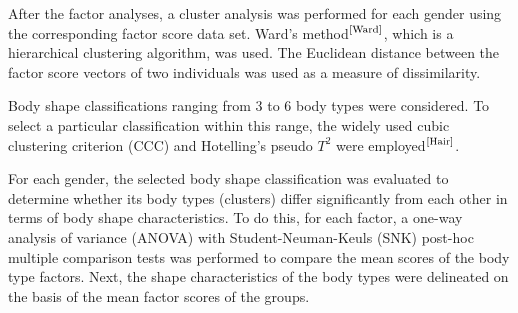 \documentclass[12pt,a4paper,openany,UKenglish]{scrreprt}
\newcommand{\bib}[1]{$^\text{\cite{#1}}$}
\begin{document}
After the factor analyses, a cluster analysis was performed for each gender using the corresponding factor score data set.
Ward's method\bib{Ward}, which is a hierarchical clustering algorithm, was used.
The Euclidean distance between the factor score vectors of two individuals was used as a measure of dissimilarity.

Body shape classifications ranging from 3 to 6 body types were considered.
To select a particular classification within this range, the widely used cubic clustering criterion (CCC) and Hotelling's pseudo $T^2$ were employed\bib{Hair}.

For each gender, the selected body shape classification was evaluated to determine whether its body types (clusters) differ significantly from each other in terms of body shape characteristics.
To do this, for each factor, a one-way analysis of variance (ANOVA) with Student-Neuman-Keuls (SNK) post-hoc multiple comparison tests was performed to compare the mean scores of the body type factors.
Next, the shape characteristics of the body types were delineated on the basis of the mean factor scores of the groups.
\end{document}
